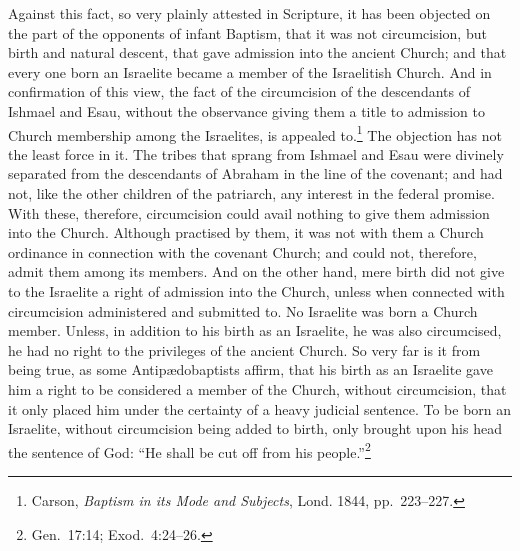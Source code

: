 \documentclass[
  english,
]{book}
\begin{document}
Against this fact, so very plainly attested in Scripture, it has been objected on the part of the opponents of infant Baptism, that it was not circumcision, but birth and natural descent, that gave admission into the ancient Church; and that every one born an Israelite became a member of the Israelitish Church. And in confirmation of this view, the fact of the circumcision of the descendants of Ishmael and Esau, without the observance giving them a title to admission to Church membership among the Israelites, is appealed to.\footnote{Carson, \emph{Baptism in its Mode and Subjects}, Lond. 1844, pp.~223--227.} The objection has not the least force in it. The tribes that sprang from Ishmael and Esau were divinely separated from the descendants of Abraham in the line of the covenant; and had not, like the other children of the patriarch, any interest in the federal promise. With these, therefore, circumcision could avail nothing to give them admission into the Church. Although practised by them, it was not with them a Church ordinance in connection with the covenant Church; and could not, therefore, admit them among its members. And on the other hand, mere birth did not give to the Israelite a right of admission into the Church, unless when connected with circumcision administered and submitted to. No Israelite was born a Church member. Unless, in addition to his birth as an Israelite, he was also circumcised, he had no right to the privileges of the ancient Church. So very far is it from being true, as some Antipædobaptists affirm, that his birth as an Israelite gave him a right to be considered a member of the Church, without circumcision, that it only placed him under the certainty of a heavy judicial sentence. To be born an Israelite, without circumcision being added to birth, only brought upon his head the sentence of God: ``He shall be cut off from his people.''\footnote{Gen.~17:14; Exod.~4:24--26.}
\end{document}

